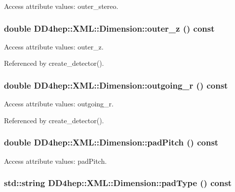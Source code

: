 Access attribute values: outer\_\-stereo. \hypertarget{struct_d_d4hep_1_1_x_m_l_1_1_dimension_ae3bb77f72bbfe8d55e90f2f1fe20457a}{
\subsubsection[{outer\_\-z}]{\setlength{\rightskip}{0pt plus 5cm}double DD4hep::XML::Dimension::outer\_\-z () const}}
\label{struct_d_d4hep_1_1_x_m_l_1_1_dimension_ae3bb77f72bbfe8d55e90f2f1fe20457a}


Access attribute values: outer\_\-z. 

Referenced by create\_\-detector().\hypertarget{struct_d_d4hep_1_1_x_m_l_1_1_dimension_a16f014d9e56dad395fffdda8d1a5f655}{
\subsubsection[{outgoing\_\-r}]{\setlength{\rightskip}{0pt plus 5cm}double DD4hep::XML::Dimension::outgoing\_\-r () const}}
\label{struct_d_d4hep_1_1_x_m_l_1_1_dimension_a16f014d9e56dad395fffdda8d1a5f655}


Access attribute values: outgoing\_\-r. 

Referenced by create\_\-detector().\hypertarget{struct_d_d4hep_1_1_x_m_l_1_1_dimension_a00e0ef45a039dcc5b3d4ce4f30e453ac}{
\subsubsection[{padPitch}]{\setlength{\rightskip}{0pt plus 5cm}double DD4hep::XML::Dimension::padPitch () const}}
\label{struct_d_d4hep_1_1_x_m_l_1_1_dimension_a00e0ef45a039dcc5b3d4ce4f30e453ac}


Access attribute values: padPitch. \hypertarget{struct_d_d4hep_1_1_x_m_l_1_1_dimension_ad410c2fa6dc3cd8edb60072a51bd3b38}{
\subsubsection[{padType}]{\setlength{\rightskip}{0pt plus 5cm}std::string DD4hep::XML::Dimension::padType () const}}
\label{struct_d_d4hep_1_1_x_m_l_1_1_dimension_ad410c2fa6dc3cd8edb60072a51bd3b38}


